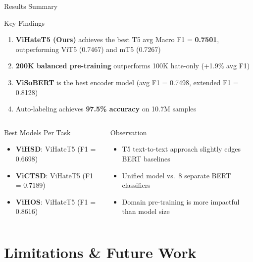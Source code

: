 \documentclass[10pt, aspectratio=169]{beamer}
\begin{document}
\begin{frame}[shrink=5]{Results Summary}
  \begin{block}{Key Findings}
    \begin{enumerate}
      \item \textbf{ViHateT5 (Ours)} achieves the best T5 avg Macro F1 = \textbf{0.7501}, outperforming ViT5 (0.7467) and mT5 (0.7267)
      \item \textbf{200K balanced pre-training} outperforms 100K hate-only (+1.9\% avg F1)
      \item \textbf{ViSoBERT} is the best encoder model (avg F1 = 0.7498, extended F1 = 0.8128)
      \item Auto-labeling achieves \textbf{97.5\% accuracy} on 10.7M samples
    \end{enumerate}
  \end{block}
  \vspace{0.2cm}

  \begin{columns}[T]
    \begin{exampleblock}{Best Models Per Task}
      \begin{itemize}
        \item \textbf{ViHSD}: ViHateT5 (F1 = 0.6698)
        \item \textbf{ViCTSD}: ViHateT5 (F1 = 0.7189)
        \item \textbf{ViHOS}: ViHateT5 (F1 = 0.8616)
      \end{itemize}
    \end{exampleblock}

    \begin{alertblock}{Observation}
      \begin{itemize}
        \item T5 text-to-text approach slightly edges BERT baselines
        \item Unified model vs.\ 8 separate BERT classifiers
        \item Domain pre-training is more impactful than model size
      \end{itemize}
    \end{alertblock}
  \end{columns}
\end{frame}

\section{Limitations \& Future Work}
\end{document}
